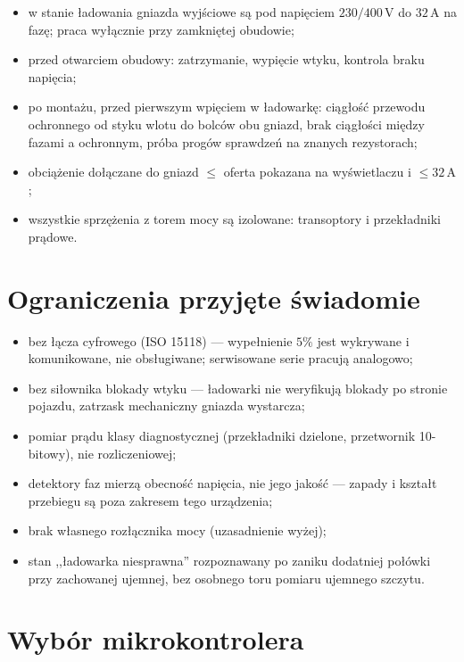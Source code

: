 \documentclass[a4paper,11pt]{article}
\newcommand{\volt}{\,\mathrm{V}}
\newcommand{\amp}{\,\mathrm{A}}
\begin{document}
\begin{itemize}
\item w stanie ładowania gniazda wyjściowe są pod napięciem $230/400\volt$ do
      $32\amp$ na fazę; praca wyłącznie przy zamkniętej obudowie;
\item przed otwarciem obudowy: zatrzymanie, wypięcie wtyku, kontrola braku napięcia;
\item po montażu, przed pierwszym wpięciem w ładowarkę: ciągłość przewodu ochronnego
      od styku wlotu do bolców obu gniazd, brak ciągłości między fazami a ochronnym,
      próba progów sprawdzeń na znanych rezystorach;
\item obciążenie dołączane do gniazd $\le$ oferta pokazana na wyświetlaczu
      i $\le 32\amp$;
\item wszystkie sprzężenia z torem mocy są izolowane: transoptory i przekładniki
      prądowe.
\end{itemize}

\section{Ograniczenia przyjęte świadomie}

\begin{itemize}
\item bez łącza cyfrowego (ISO 15118) --- wypełnienie $5\%$ jest wykrywane
      i komunikowane, nie obsługiwane; serwisowane serie pracują analogowo;
\item bez siłownika blokady wtyku --- ładowarki nie weryfikują blokady po stronie
      pojazdu, zatrzask mechaniczny gniazda wystarcza;
\item pomiar prądu klasy diagnostycznej (przekładniki dzielone, przetwornik
      10-bitowy), nie rozliczeniowej;
\item detektory faz mierzą obecność napięcia, nie jego jakość --- zapady i kształt
      przebiegu są poza zakresem tego urządzenia;
\item brak własnego rozłącznika mocy (uzasadnienie wyżej);
\item stan ,,ładowarka niesprawna'' rozpoznawany po zaniku dodatniej połówki przy
      zachowanej ujemnej, bez osobnego toru pomiaru ujemnego szczytu.
\end{itemize}

\section{Wybór mikrokontrolera}
\end{document}
